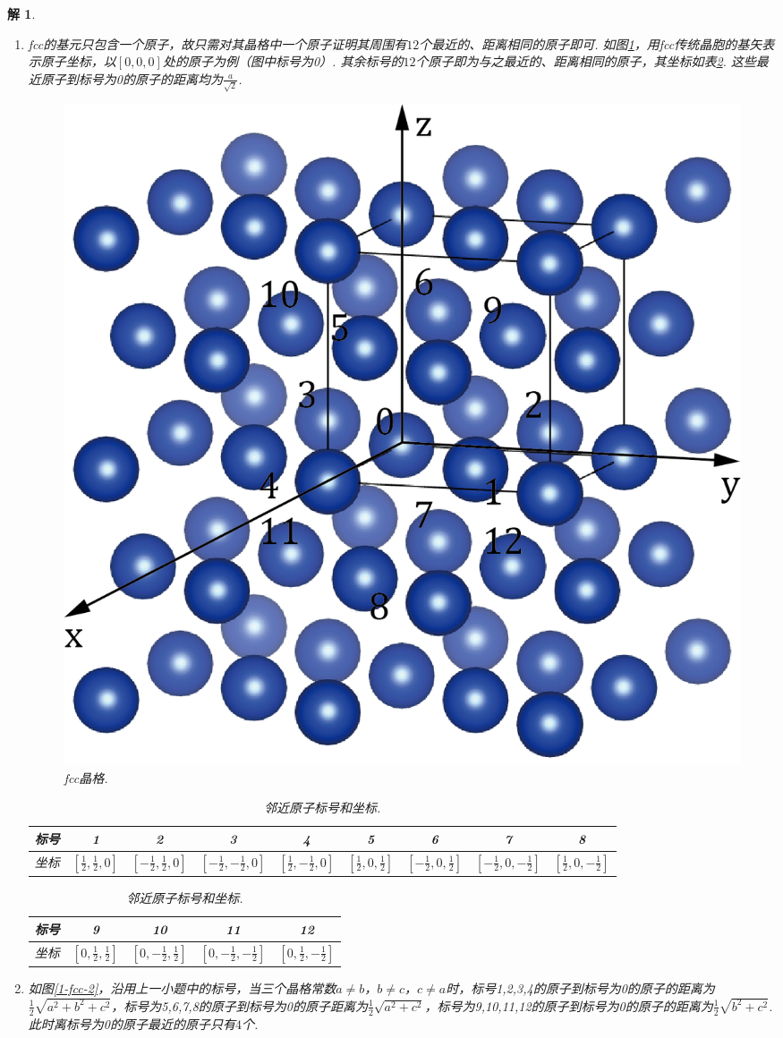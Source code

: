 \documentclass[UTF8,10pt,a4paper]{article}
\theoremstyle{Problem}
\theoremstyle{Solution}
\newtheorem*{sol}{解}
\begin{document}
\begin{sol}
    \begin{enumerate}
        \item[(a)] fcc的基元只包含一个原子，故只需对其晶格中一个原子证明其周围有$12$个最近的、距离相同的原子即可. 如图\ref{1-fcc}，用fcc传统晶胞的基矢表示原子坐标，以$[0,0,0]$处的原子为例（图中标号为0）. 其余标号的$12$个原子即为与之最近的、距离相同的原子，其坐标如表\ref{1-fcc-T}. 这些最近原子到标号为0的原子的距离均为$\frac{a}{\sqrt{2}}$.
        \begin{figure}[h]
            \centering
            \includegraphics[width=.32\textwidth]{1-fcc-2.png}
            \caption{fcc晶格.}
            \label{1-fcc}
        \end{figure}
        \begin{table}[h]
            \caption{邻近原子标号和坐标.}
            \label{1-fcc-T}
            \begin{tabular}{c|cccccccc}
            标号 & 1 & 2 & 3 & 4 & 5 & 6 & 7 & 8 \\ \hline
            坐标 & $[\frac{1}{2},\frac{1}{2},0]$ & $[-\frac{1}{2},\frac{1}{2},0]$ & $[-\frac{1}{2},-\frac{1}{2},0]$ & $[\frac{1}{2},-\frac{1}{2},0]$ & $[\frac{1}{2},0,\frac{1}{2}]$ & $[-\frac{1}{2},0,\frac{1}{2}]$ & $[-\frac{1}{2},0,-\frac{1}{2}]$ & $[\frac{1}{2},0,-\frac{1}{2}]$
            \end{tabular}
            \begin{tabular}{c|cccc}
                标号 & 9 & 10 & 11 & 12 \\ \hline
                坐标 & $[0,\frac{1}{2},\frac{1}{2}]$ & $[0,-\frac{1}{2},\frac{1}{2}]$ & $[0,-\frac{1}{2},-\frac{1}{2}]$ & $[0,\frac{1}{2},-\frac{1}{2}]$
                \end{tabular}
        \end{table}
        \item[(b)] 如图\ref{1-fcc-2}，沿用上一小题中的标号，当三个晶格常数$a\neq b$，$b\neq c$，$c\neq a$时，标号1,2,3,4的原子到标号为0的原子的距离为$\frac{1}{2}\sqrt{a^2+b^2+c^2}$，标号为5,6,7,8的原子到标号为0的原子距离为$\frac{1}{2}\sqrt{a^2+c^2}$，标号为9,10,11,12的原子到标号为0的原子的距离为$\frac{1}{2}\sqrt{b^2+c^2}$. 此时离标号为0的原子最近的原子只有$4$个.

\end{enumerate}
\end{sol}
\end{document}

